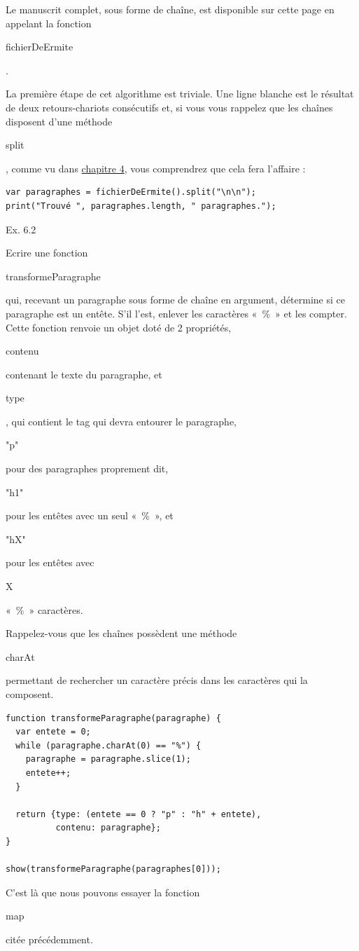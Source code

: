 \documentclass{FramateX}
\renewcommand{\texttt}[1]{\begin{sffamily}{#1}\end{sffamily}}
\begin{document}
Le manuscrit complet, sous forme de chaîne, est disponible sur cette
page en appelant la fonction \texttt{fichierDeErmite}.

\begin{center}\end{center}

La première étape de cet algorithme est triviale. Une ligne blanche est
le résultat de deux retours-chariots consécutifs et, si vous vous
rappelez que les chaînes disposent d'une méthode \texttt{split}, comme
vu dans \href{chapter4.html}{chapitre 4}, vous comprendrez que cela fera
l'affaire :

\begin{lstlisting}
var paragraphes = fichierDeErmite().split("\n\n");
print("Trouvé ", paragraphes.length, " paragraphes.");
\end{lstlisting}
\begin{center}\end{center}

Ex. 6.2

Ecrire une fonction \texttt{transformeParagraphe} qui, recevant un
paragraphe sous forme de chaîne en argument, détermine si ce paragraphe
est un entête. S'il l'est, enlever les caractères «~\%~» et les compter.
Cette fonction renvoie un objet doté de 2 propriétés, \texttt{contenu}
contenant le texte du paragraphe, et \texttt{type}, qui contient le tag
qui devra entourer le paragraphe, \texttt{"p"} pour des paragraphes
proprement dit, \texttt{"h1"} pour les entêtes avec un seul «~\%~», et
\texttt{"hX"} pour les entêtes avec \texttt{X} «~\%~» caractères.

Rappelez-vous que les chaînes possèdent une méthode \texttt{charAt}
permettant de rechercher un caractère précis dans les caractères qui la
composent.

\begin{lstlisting}
function transformeParagraphe(paragraphe) {
  var entete = 0;
  while (paragraphe.charAt(0) == "%") {
    paragraphe = paragraphe.slice(1);
    entete++;
  }

  return {type: (entete == 0 ? "p" : "h" + entete),
          contenu: paragraphe};
}

show(transformeParagraphe(paragraphes[0]));
\end{lstlisting}
\begin{center}\end{center}

C'est là que nous pouvons essayer la fonction \texttt{map} citée
précédemment.
\end{document}
